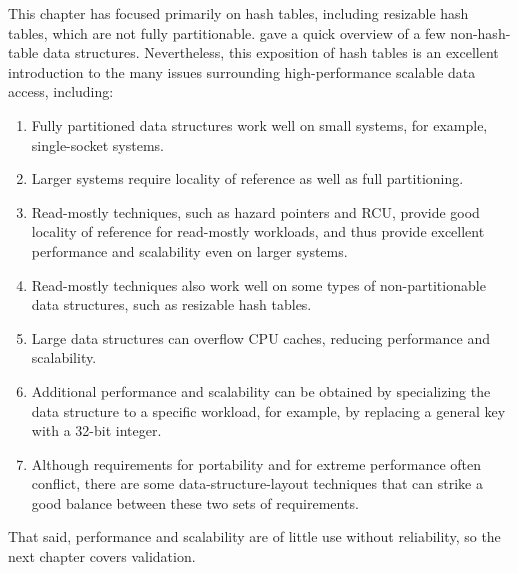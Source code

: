 This chapter has focused primarily on hash tables, including resizable
hash tables, which are not fully partitionable.
 gave a quick
overview of a few non-hash-table data structures.
Nevertheless, this exposition of hash tables is an excellent introduction
to the many issues surrounding high-performance scalable data access,
including:

\begin{enumerate}
\item	Fully partitioned data structures work well on small systems,
	for example, single-socket systems.
\item	Larger systems require locality of reference as well as
	full partitioning.
\item	Read-mostly techniques, such as hazard pointers and RCU,
	provide good locality of reference for read-mostly workloads,
	and thus provide excellent performance and scalability even
	on larger systems.
\item	Read-mostly techniques also work well on some types of
	non-partitionable data structures, such as resizable hash tables.
\item	Large data structures can overflow CPU caches, reducing performance
	and scalability.
\item	Additional performance and scalability can be obtained by
	specializing the data structure to a specific workload,
	for example, by replacing a general key with a 32-bit integer.
\item	Although requirements for portability and for extreme performance
	often conflict, there are some data-structure-layout techniques
	that can strike a good balance between these two sets of
	requirements.
\end{enumerate}

That said, performance and scalability are of little use without reliability,
so the next chapter covers validation.

